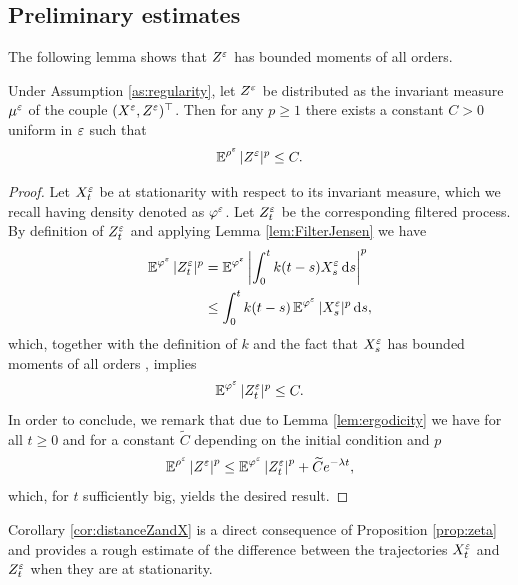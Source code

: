 \documentclass[10pt]{article}
\begin{document}
\begin{appendices}
\subsection{Preliminary estimates}

The following lemma shows that $Z^\varepsilon$ has bounded moments of all orders.
\begin{lemma} \label{lem:bounded_momentZ}
	Under Assumption \ref{as:regularity}, let $Z^\varepsilon$ be distributed as the invariant measure $\mu^\varepsilon$ of the couple $(X^\varepsilon, Z^\varepsilon)^\top$. Then for any $p \geq 1$ there exists a constant $C > 0$ uniform in $\varepsilon$ such that 
	\begin{equation}
	\operatorname{\mathbb{E}}^{\rho^\varepsilon}|Z^\varepsilon|^p \le C.
	\end{equation}
\end{lemma}
\begin{proof} Let $X_t^\varepsilon$ be at stationarity with respect to its invariant measure, which we recall having density denoted as $\varphi^\varepsilon$. Let $Z_t^\varepsilon$ be the corresponding filtered process. By definition of $Z^\varepsilon_t$ and applying Lemma \ref{lem:FilterJensen} we have
	\begin{equation}
	\begin{aligned}
	\operatorname{\mathbb{E}}^{\varphi^\varepsilon} |Z_t^\varepsilon|^p &= \operatorname{\mathbb{E}}^{\varphi^\varepsilon} \left| \int_0^t k(t-s) X_s^\varepsilon \,\mathrm{d} s \right|^p \\
	&\leq \int_0^t k(t - s) \operatorname{\mathbb{E}}^{\varphi^\varepsilon} |X_s^\varepsilon|^p \,\mathrm{d} s,
	\end{aligned}
	\end{equation}
	which, together with the definition of $k$ and the fact that $X_s^\varepsilon$ has bounded moments of all orders \cite[Corollary 5.4]{PaS07}, implies
	\begin{equation}
	\operatorname{\mathbb{E}}^{\varphi^\varepsilon}|Z_t^\varepsilon|^p \le C.
	\end{equation}
	In order to conclude, we remark that due to Lemma \ref{lem:ergodicity} we have for all $t \geq 0$ and for a constant $\widetilde C$ depending on the initial condition and $p$  
	\begin{equation}
	\operatorname{\mathbb{E}}^{\rho^\varepsilon} \left\lvert Z^\varepsilon\right\rvert^p \leq \operatorname{\mathbb{E}}^{\varphi^\varepsilon}\left\lvert Z_t^\varepsilon\right\rvert^p + \widetilde C e^{-\lambda t},
	\end{equation}
	which, for $t$ sufficiently big, yields the desired result.
\end{proof}


Corollary \ref{cor:distanceZandX} is a direct consequence of Proposition \ref{prop:zeta} and provides a rough estimate of the difference between the trajectories $X_t^\varepsilon$ and $Z_t^\varepsilon$ when they are at stationarity.


\end{appendices}
\end{document}
